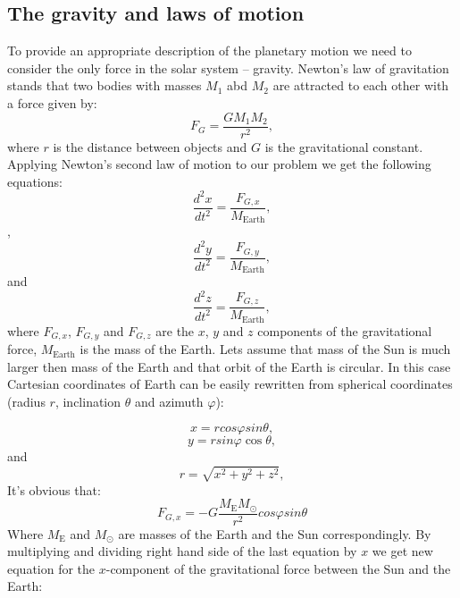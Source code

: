 \documentclass[10pt]{article}
\begin{document}
\subsection{The gravity and laws of motion}
To provide an appropriate description of the planetary motion we need to consider the only force in the solar system  -- gravity. Newton's law of gravitation stands that two bodies with masses $M_1$ abd $M_2$ are attracted to each other with a force given by:
\[
F_G=\frac{GM_{1}M_{2}}{r^2},
\]
where $r$ is the distance between objects and $G$ is the gravitational constant.
Applying  Newton's second law of motion to our problem we get the following equations:
\[
\frac{d^2x}{dt^2}=\frac{F_{G,x}}{M_{\mathrm{Earth}}},
\]
, 
\[
\frac{d^2y}{dt^2}=\frac{F_{G,y}}{M_{\mathrm{Earth}}},
\]
and
\[
\frac{d^2z}{dt^2}=\frac{F_{G,z}}{M_{\mathrm{Earth}}},
\]
where $F_{G,x}$, $F_{G,y}$ and $F_{G,z}$ are the $x$, $y$ and $z$ components of the gravitational force, $M_{\mathrm{Earth}}$ is the mass of the Earth.
Lets assume that mass of the Sun is much larger then mass of the Earth and that orbit of the Earth is circular. In this case Cartesian coordinates of Earth can be easily rewritten from spherical coordinates (radius $r$, inclination $\theta$ and azimuth $\varphi$):

\[
x=r cos\varphi sin\theta,
\]
\[
y=r sin\varphi\cos\theta,
\]
and
\[
r=\sqrt{x^2+y^2+z^2},
\]
It's obvious that:
\[
{F_{G,x}}=-G\frac{M_{\mathrm{E}}M_{\odot}}{r^2}cos\varphi sin\theta
\]
Where $M_{\mathrm{E}}$ and $M_{\odot}$ are masses of the Earth and the Sun correspondingly. By multiplying and dividing right hand side of the last equation by $x$ we get new equation for the $x$-component of the gravitational force between the Sun and the Earth:
\end{document}
